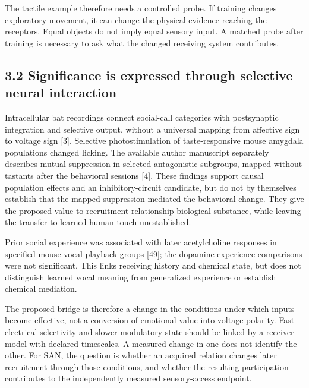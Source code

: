 \documentclass[
  american,
  11pt,
  letterpaper,
]{article}
\begin{document}
The tactile example therefore needs a controlled probe. If training changes exploratory movement, it can change the physical evidence reaching the receptors. Equal objects do not imply equal sensory input. A matched probe after training is necessary to ask what the changed receiving system contributes.

\subsection{3.2 Significance is expressed through selective neural interaction}\label{significance-is-expressed-through-selective-neural-interaction}

Intracellular bat recordings connect social-call categories with postsynaptic integration and selective output, without a universal mapping from affective sign to voltage sign {[}3{]}. Selective photostimulation of taste-responsive mouse amygdala populations changed licking. The available author manuscript separately describes mutual suppression in selected antagonistic subgroups, mapped without tastants after the behavioral sessions {[}4{]}. These findings support causal population effects and an inhibitory-circuit candidate, but do not by themselves establish that the mapped suppression mediated the behavioral change. They give the proposed value-to-recruitment relationship biological substance, while leaving the transfer to learned human touch unestablished.

Prior social experience was associated with later acetylcholine responses in specified mouse vocal-playback groups {[}49{]}; the dopamine experience comparisons were not significant. This links receiving history and chemical state, but does not distinguish learned vocal meaning from generalized experience or establish chemical mediation.

The proposed bridge is therefore a change in the conditions under which inputs become effective, not a conversion of emotional value into voltage polarity. Fast electrical selectivity and slower modulatory state should be linked by a receiver model with declared timescales. A measured change in one does not identify the other. For SAN, the question is whether an acquired relation changes later recruitment through those conditions, and whether the resulting participation contributes to the independently measured sensory-access endpoint.
\end{document}
